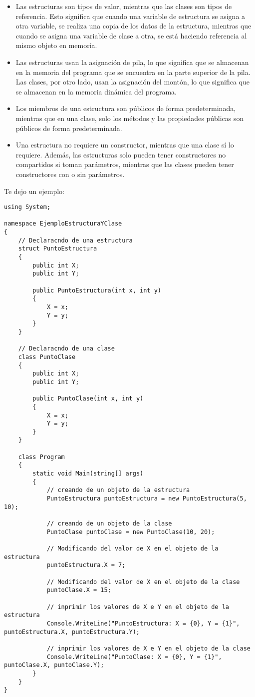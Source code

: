 \documentclass[executivepaper]{article}
\begin{document}
\begin{itemize}
    \item Las estructuras son tipos de valor, mientras que las clases son tipos de referencia. Esto significa que cuando una variable de estructura se asigna a otra variable, se realiza una copia de los datos de la estructura, mientras que cuando se asigna una variable de clase a otra, se está haciendo referencia al mismo objeto en memoria.
    \item Las estructuras usan la asignación de pila, lo que significa que se almacenan en la memoria del programa que se encuentra en la parte superior de la pila. Las clases, por otro lado, usan la asignación del montón, lo que significa que se almacenan en la memoria dinámica del programa.
    \item Los miembros de una estructura son públicos de forma predeterminada, mientras que en una clase, solo los métodos y las propiedades públicas son públicos de forma predeterminada.
    \item Una estructura no requiere un constructor, mientras que una clase sí lo requiere. Además, las estructuras solo pueden tener constructores no compartidos si toman parámetros, mientras que las clases pueden tener constructores con o sin parámetros.
\end{itemize}

Te dejo un ejemplo:
\begin{lstlisting}
using System;

namespace EjemploEstructuraYClase
{
    // Declaracndo de una estructura
    struct PuntoEstructura
    {
        public int X;
        public int Y;

        public PuntoEstructura(int x, int y)
        {
            X = x;
            Y = y;
        }
    }

    // Declaracndo de una clase
    class PuntoClase
    {
        public int X;
        public int Y;

        public PuntoClase(int x, int y)
        {
            X = x;
            Y = y;
        }
    }

    class Program
    {
        static void Main(string[] args)
        {
            // creando de un objeto de la estructura
            PuntoEstructura puntoEstructura = new PuntoEstructura(5, 10);

            // creando de un objeto de la clase
            PuntoClase puntoClase = new PuntoClase(10, 20);

            // Modificando del valor de X en el objeto de la estructura
            puntoEstructura.X = 7;

            // Modificando del valor de X en el objeto de la clase
            puntoClase.X = 15;

            // inprimir los valores de X e Y en el objeto de la estructura
            Console.WriteLine("PuntoEstructura: X = {0}, Y = {1}", puntoEstructura.X, puntoEstructura.Y);

            // inprimir los valores de X e Y en el objeto de la clase
            Console.WriteLine("PuntoClase: X = {0}, Y = {1}", puntoClase.X, puntoClase.Y);
        }
    }
}
\end{lstlisting}
\end{document}
